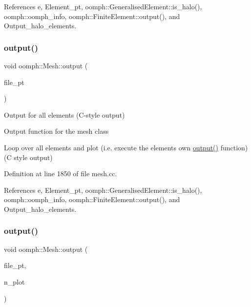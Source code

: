 References e, Element\+\_\+pt, oomph\+::\+Generalised\+Element\+::is\+\_\+halo(), oomph\+::oomph\+\_\+info, oomph\+::\+Finite\+Element\+::output(), and Output\+\_\+halo\+\_\+elements.

\mbox{\label{classoomph_1_1Mesh_a8d2a1aa08f3a7912c5e3f2d5f30e0110}} 
\subsubsection{\texorpdfstring{output()}{output()}\hspace{0.1cm}{\footnotesize\ttfamily [3/6]}}
{\footnotesize\ttfamily void oomph\+::\+Mesh\+::output (\begin{DoxyParamCaption}\item[{F\+I\+LE $\ast$}]{file\+\_\+pt }\end{DoxyParamCaption})}



Output for all elements (C-\/style output) 

Output function for the mesh class

Loop over all elements and plot (i.\+e. execute the element\textquotesingle{}s own \hyperlink{classoomph_1_1Mesh_aab74388e8e21325f3ca26f1bd99c26f7}{output()} function) (C style output) 

Definition at line 1850 of file mesh.\+cc.



References e, Element\+\_\+pt, oomph\+::\+Generalised\+Element\+::is\+\_\+halo(), oomph\+::oomph\+\_\+info, oomph\+::\+Finite\+Element\+::output(), and Output\+\_\+halo\+\_\+elements.

\mbox{\label{classoomph_1_1Mesh_a926a1595fd8e9932e8c87a58a7ae23e1}} 
\subsubsection{\texorpdfstring{output()}{output()}\hspace{0.1cm}{\footnotesize\ttfamily [4/6]}}
{\footnotesize\ttfamily void oomph\+::\+Mesh\+::output (\begin{DoxyParamCaption}\item[{F\+I\+LE $\ast$}]{file\+\_\+pt,  }\item[{const unsigned \&}]{n\+\_\+plot }\end{DoxyParamCaption})}



